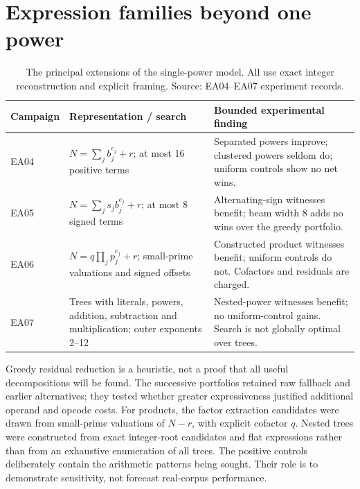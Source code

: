 \documentclass[11pt,a4paper]{article}
\begin{document}
\section{Expression families beyond one power}
\begin{table}[htbp]
\centering\small
\begin{tabular}{@{}p{19mm}p{54mm}p{75mm}@{}}
\toprule
Campaign & Representation / search & Bounded experimental finding\\\midrule
EA04 & $N=\sum_j b_j^{e_j}+r$; at most 16 positive terms & Separated powers improve; clustered powers seldom do; uniform controls show no net wins.\\
EA05 & $N=\sum_j s_j b_j^{e_j}+r$; at most 8 signed terms & Alternating-sign witnesses benefit; beam width 8 adds no wins over the greedy portfolio.\\
EA06 & $N=q\prod_j p_j^{e_j}+r$; small-prime valuations and signed offsets & Constructed product witnesses benefit; uniform controls do not. Cofactors and residuals are charged.\\
EA07 & Trees with literals, powers, addition, subtraction and multiplication; outer exponents 2--12 & Nested-power witnesses benefit; no uniform-control gains. Search is not globally optimal over trees.\\\bottomrule
\end{tabular}
\caption{The principal extensions of the single-power model. All use exact integer reconstruction and explicit framing. Source: EA04--EA07 experiment records.}
\label{tab:families}
\end{table}
Greedy residual reduction is a heuristic, not a proof that all useful decompositions will be found. The successive portfolios retained raw fallback and earlier alternatives; they tested whether greater expressiveness justified additional operand and opcode costs. For products, the factor extraction candidates were drawn from small-prime valuations of $N-r$, with explicit cofactor $q$. Nested trees were constructed from exact integer-root candidates and flat expressions rather than from an exhaustive enumeration of all trees. The positive controls deliberately contain the arithmetic patterns being sought. Their role is to demonstrate sensitivity, not forecast real-corpus performance. \cite{families}
\end{document}
